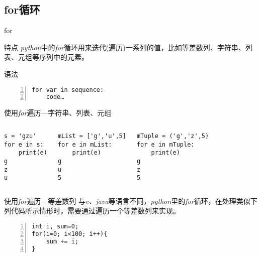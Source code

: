 \documentclass{beamer}
\begin{document}
\subsection{for循环}
\begin{frame}[fragile]{for}
\begin{block}{特点}
\textit{python}中的\textit{for}循环用来迭代(遍历)一系列的值，比如等差数列、字符串、列表、元组等序列中的元素。
\end{block}
\begin{block}{语法}
\begin{Verbatim}[numbers=left,frame=single,rulecolor=\color{red}]
for var in sequence:
    code…
\end{Verbatim}
\end{block}
\end{frame}

\begin{frame}[fragile]{使用\textit{for}遍历—字符串、列表、元组}

\begin{columns}
\begin{Verbatim}[numbers=none,frame=single,rulecolor=\color{red}]
s = 'gzu'
for e in s:
    print(e)
g
z
u  
\end{Verbatim}

\begin{Verbatim}[numbers=none,frame=single,rulecolor=\color{red}]
mList = ['g','u',5]
for e in mList:
    print(e)
g
u
5
\end{Verbatim}
\begin{Verbatim}[numbers=none,frame=single,rulecolor=\color{red}]
mTuple = ('g','z',5)
for e in mTuple:
    print(e)
g
z
5
\end{Verbatim}
\end{columns}
\end{frame}

\begin{frame}[fragile]{使用\textit{for}遍历—等差数列}
与\textit{c、java}等语言不同，\textit{python}里的\textit{for}循环，在处理类似下列代码所示情形时，需要通过遍历一个等差数列来实现。
\begin{Verbatim}[numbers=left,frame=single,rulecolor=\color{red}]
int i, sum=0;
for(i=0; i<100; i++){
    sum += i;
}
\end{Verbatim}
\end{frame}
\end{document}
